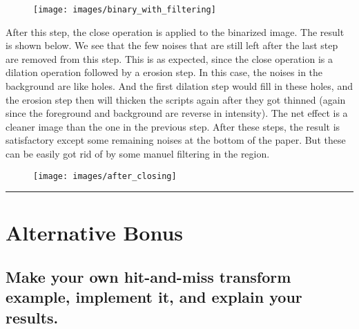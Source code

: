 \documentclass[conference]{styles/acmsiggraph}
\newenvironment{answer}{}{}
\begin{document}
\begin{answer}
	\begin{figure}[H]
		\centering
		\texttt{[image: images/binary\_with\_filtering]}
		\end{figure}	
		
		After this step, the close operation is applied to the binarized image. The result is shown below. We see that the few noises that are still left after the last step are removed from this step. This is as expected, since the close operation is a dilation operation followed by a erosion step. In this case, the noises in the background are like holes. And the first dilation step would fill in these holes, and the erosion step then will thicken the scripts again after they got thinned (again since the foreground and background are reverse in intensity). The net effect is a cleaner image than the one in the previous step. After these steps, the result is satisfactory except some remaining noises at the bottom of the paper. But these can be easily got rid of by some manuel filtering in the region.
		
		\begin{figure}[H]
			\centering
			\texttt{[image: images/after\_closing]}
			\end{figure}	

		\rule{\textwidth}{0.4pt}
		\end{answer}
\section{Alternative Bonus}
\subsection{Make your own hit-and-miss transform example, implement it, and explain your
results.}
\end{document}
